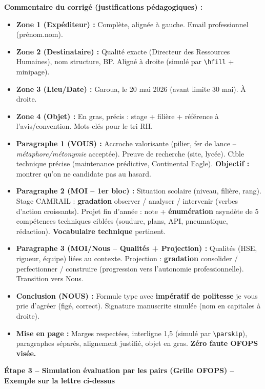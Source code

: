 \documentclass[11pt]{article}
\begin{document}
\begin{exoresolu}
\par
\textbf{Commentaire du corrigé (justifications pédagogiques) :}
\begin{itemize}
    \item \textbf{Zone 1 (Expéditeur) :} Complète, alignée à gauche. Email professionnel (prénom.nom).
    \item \textbf{Zone 2 (Destinataire) :} Qualité exacte (\og{}Directeur des Ressources Humaines\fg{}), nom structure, BP. Aligné à droite (simulé par \texttt{\textbackslash hfill} + minipage).
    \item \textbf{Zone 3 (Lieu/Date) :} \og{}Garoua, le 20 mai 2026\fg{} (avant limite 30 mai). À droite.
    \item \textbf{Zone 4 (Objet) :} En gras, précis : stage + filière + référence à l'avis/convention. Mots-clés pour le tri RH.
    \item \textbf{Paragraphe 1 (VOUS) :} Accroche valorisante (\og{}pilier, fer de lance\fg{} -- \emph{métaphore/métonymie} acceptée). Preuve de recherche (site, lycée). Cible technique précise (maintenance prédictive, Continental Eagle). \textbf{Objectif :} montrer qu'on ne candidate pas au hasard.
    \item \textbf{Paragraphe 2 (MOI -- 1er bloc) :} Situation scolaire (niveau, filière, rang). Stage CAMRAIL : \textbf{gradation} \og{}observer / analyser / intervenir\fg{} (verbes d'action croissants). Projet fin d'année : note + \textbf{énumération} asyndète de 5 compétences techniques ciblées (soudure, plans, API, pneumatique, rédaction). \textbf{Vocabulaire technique} pertinent.
    \item \textbf{Paragraphe 3 (MOI/Nous -- Qualités + Projection) :} Qualités (HSE, rigueur, équipe) liées au contexte. Projection : \textbf{gradation} \og{}consolider / perfectionner / construire\fg{} (progression vers l'autonomie professionnelle). Transition vers \og{}Nous\fg{}.
    \item \textbf{Conclusion (NOUS) :} Formule type avec \textbf{impératif de politesse} \og{}je vous prie d'agréer\fg{} (figé, correct). Signature manuscrite simulée (nom en capitales à droite).
    \item \textbf{Mise en page :} Marges respectées, interligne 1,5 (simulé par \texttt{\textbackslash parskip}), paragraphes séparés, alignement justifié, objet en gras. \textbf{Zéro faute OFOPS visée.}
\end{itemize}

\par
\textbf{Étape 3 -- Simulation évaluation par les pairs (Grille OFOPS) -- Exemple sur la lettre ci-dessus}


\end{exoresolu}
\end{document}

